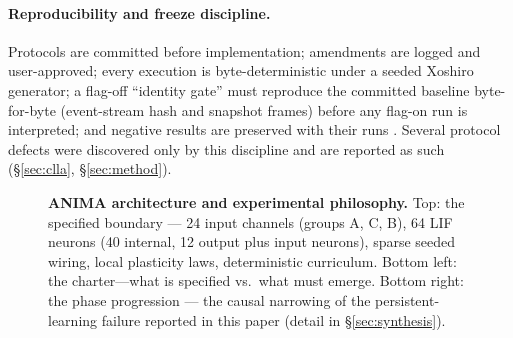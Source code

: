 \paragraph{Reproducibility and freeze discipline.}
Protocols are committed before implementation; amendments are logged
and user-approved; every execution is byte-deterministic under a seeded
Xoshiro generator; a flag-off ``identity gate'' must reproduce the
committed baseline byte-for-byte (event-stream hash and snapshot
frames) before any flag-on run is interpreted; and negative results are
preserved with their runs \cite{overview,cllaprot}. Several protocol
defects were discovered only by this discipline and are reported as
such (\S\ref{sec:clla}, \S\ref{sec:method}).

\begin{figure}[t]
\centering

\caption{\textbf{ANIMA architecture and experimental philosophy.}
Top: the specified boundary --- 24 input channels (groups A, C, B),
64 LIF neurons (40 internal, 12 output plus input neurons), sparse
seeded wiring, local plasticity laws, deterministic curriculum. Bottom
left: the charter---what is specified vs.\ what must emerge. Bottom
right: the phase progression --- the causal narrowing of the persistent-
learning failure reported in this paper (detail in \S\ref{sec:synthesis}).}
\label{fig:architecture}
\end{figure}